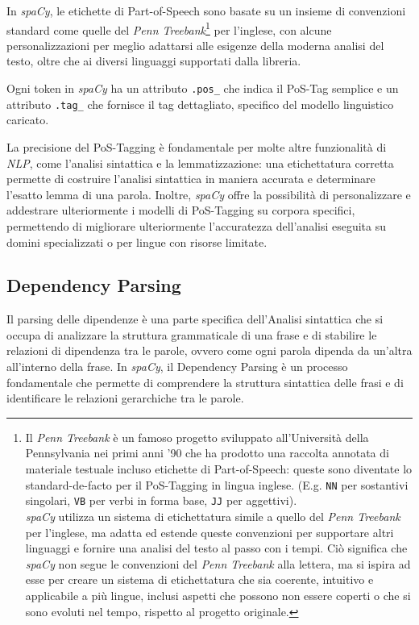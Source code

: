 \documentclass[12pt]{report}
\newcommand{\spacy}{\textsl{spaCy}\xspace}
\newcommand{\nlp}{\textsl{NLP}\xspace}
\begin{document}
In \spacy, le etichette di Part-of-Speech sono basate su un insieme di convenzioni standard come quelle del \textit{Penn Treebank}\footnote{Il \textit{Penn Treebank} è un famoso progetto sviluppato all'Università della Pennsylvania nei primi anni '90 che ha prodotto una raccolta annotata di materiale testuale incluso etichette di Part-of-Speech: queste sono diventate lo standard-de-facto per il PoS-Tagging in lingua inglese. (E.g. \texttt{NN} per sostantivi singolari, \texttt{VB} per verbi in forma base, \texttt{JJ} per aggettivi).\\
\spacy utilizza un sistema di etichettatura simile a quello del \textit{Penn Treebank} per l'inglese, ma adatta ed estende queste convenzioni per supportare altri linguaggi e fornire una analisi del testo al passo con i tempi. Ciò significa che \spacy non segue le convenzioni del \textit{Penn Treebank} alla lettera, ma si ispira ad esse per creare un sistema di etichettatura che sia coerente, intuitivo e applicabile a più lingue, inclusi aspetti che possono non essere coperti o che si sono evoluti nel tempo, rispetto al progetto originale.} per l'inglese, con alcune personalizzazioni per meglio adattarsi alle esigenze della moderna analisi del testo, oltre che ai diversi linguaggi supportati dalla libreria.

Ogni token in \spacy ha un attributo \texttt{.pos\_} che indica il PoS-Tag semplice e un attributo \texttt{.tag\_} che fornisce il tag dettagliato, specifico del modello linguistico caricato.

La precisione del PoS-Tagging è fondamentale per molte altre funzionalità di \nlp, come l'analisi sintattica e la lemmatizzazione: una etichettatura corretta permette di costruire l'analisi sintattica in maniera accurata e determinare l'esatto lemma di una parola. Inoltre, \spacy offre la possibilità di personalizzare e addestrare ulteriormente i modelli di PoS-Tagging su corpora specifici, permettendo di migliorare ulteriormente l'accuratezza dell'analisi eseguita su domini specializzati o per lingue con risorse limitate.


\subsection{Dependency Parsing}
Il parsing delle dipendenze è una parte specifica dell'\textsf{Analisi sintattica} che si occupa di analizzare la struttura grammaticale di una frase e di stabilire le relazioni di dipendenza tra le parole, ovvero come ogni parola dipenda da un'altra all'interno della frase. In \spacy, il Dependency Parsing è un processo fondamentale che permette di comprendere la struttura sintattica delle frasi e di identificare le relazioni gerarchiche tra le parole.
\end{document}
